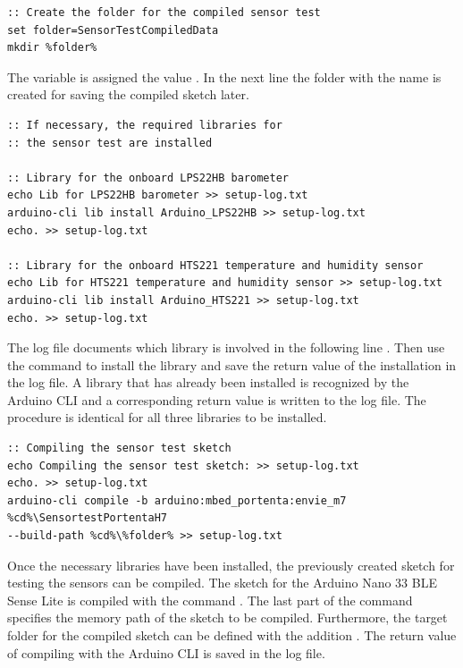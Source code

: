 \begin{lstlisting}
:: Create the folder for the compiled sensor test
set folder=SensorTestCompiledData
mkdir %folder%
\end{lstlisting}

The variable  is assigned the value . In the next line  the folder with the name  is created for saving the compiled sketch later.

\begin{lstlisting}
:: If necessary, the required libraries for 
:: the sensor test are installed

:: Library for the onboard LPS22HB barometer
echo Lib for LPS22HB barometer >> setup-log.txt
arduino-cli lib install Arduino_LPS22HB >> setup-log.txt
echo. >> setup-log.txt

:: Library for the onboard HTS221 temperature and humidity sensor
echo Lib for HTS221 temperature and humidity sensor >> setup-log.txt
arduino-cli lib install Arduino_HTS221 >> setup-log.txt
echo. >> setup-log.txt
\end{lstlisting}

The log file documents which library is involved in the following line . Then use the command  to install the library and save the return value of the installation in the log file. A library that has already been installed is recognized by the Arduino CLI and a corresponding return value is written to the log file. The procedure is identical for all three libraries to be installed.

\begin{lstlisting}
:: Compiling the sensor test sketch
echo Compiling the sensor test sketch: >> setup-log.txt
echo. >> setup-log.txt
arduino-cli compile -b arduino:mbed_portenta:envie_m7 
%cd%\SensortestPortentaH7 
--build-path %cd%\%folder% >> setup-log.txt
\end{lstlisting}

Once the necessary libraries have been installed, the previously created sketch for testing the sensors can be compiled. The sketch for the Arduino Nano 33 BLE Sense Lite is compiled with the command . The last part of the command specifies the memory path of the sketch to be compiled. Furthermore, the target folder for the compiled sketch can be defined with the addition . The return value of compiling with the Arduino CLI is saved in the log file.

